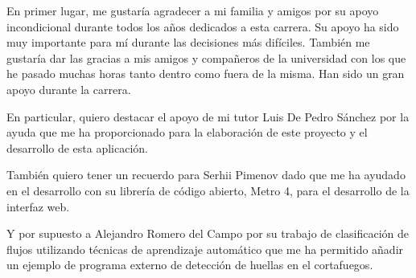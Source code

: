 En primer lugar, me gustaría agradecer a mi familia y amigos por su apoyo incondicional durante todos los años dedicados a esta carrera. Su apoyo ha sido muy importante para mí durante las decisiones más difíciles. También me gustaría dar las gracias a mis amigos y compañeros de la universidad con los que he pasado muchas horas tanto dentro como fuera de la misma. Han sido un gran apoyo durante la carrera.

En particular, quiero destacar el apoyo de mi tutor Luis De Pedro Sánchez por la ayuda que me ha proporcionado para la elaboración de este proyecto y el desarrollo de esta aplicación.

También quiero tener un recuerdo para Serhii Pimenov dado que me ha ayudado en el desarrollo con su librería de código abierto, Metro 4, para el desarrollo de la interfaz web. 

Y por supuesto a Alejandro Romero del Campo por su trabajo de clasificación de flujos utilizando técnicas de aprendizaje automático que me ha permitido añadir un ejemplo de programa externo de detección de huellas en el cortafuegos.